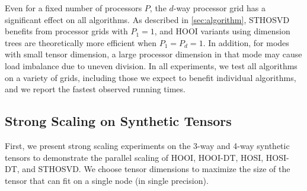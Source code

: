 Even for a fixed number of processors $P$, the $d$-way processor grid has a
significant effect on all algorithms. As described in \cref{sec:algorithm},
STHOSVD benefits from processor grids with $P_1=1$, and HOOI variants using
dimension trees are theoretically more efficient when $P_1=P_d=1$. In addition,
for modes with small tensor dimension, a large processor dimension in that mode
may cause load imbalance due to uneven division. In all experiments, we test all
algorithms on a variety of grids, including those we expect to benefit
individual algorithms, and we report the fastest observed running times.

\subsection{Strong Scaling on Synthetic Tensors} \label{sec:synthetic_strong_scaling} 

    First, we present strong scaling
    experiments on the 3-way and 4-way synthetic tensors to demonstrate the parallel
    scaling of HOOI, HOOI-DT, HOSI, HOSI-DT, and STHOSVD. We choose tensor
    dimensions to maximize the size of the tensor that can fit on a single node (in
    single precision).

